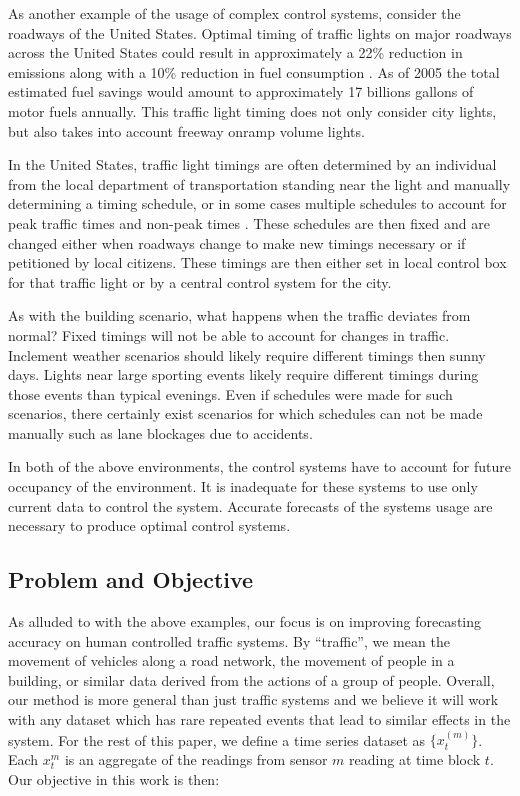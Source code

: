 As another example of the usage of complex control systems, consider the roadways of the United States.  Optimal timing of traffic lights on major roadways across the United States could result in approximately a 22\% reduction in emissions along with a 10\% reduction in fuel consumption \cite{DOT2007}.  As of 2005 the total estimated fuel savings would amount to approximately 17 billions gallons of motor fuels annually.  This traffic light timing does not only consider city lights, but also takes into account freeway onramp volume lights.

In the United States, traffic light timings are often determined by an individual from the local department of transportation standing near the light and manually determining a timing schedule, or in some cases multiple schedules to account for peak traffic times and non-peak times \cite{Koonce2008}.  These schedules are then fixed and are changed either when roadways change to make new timings necessary or if petitioned by local citizens.  These timings are then either set in local control box for that traffic light or by a central control system for the city.  

As with the building scenario, what happens when the traffic deviates from normal?  Fixed timings will not be able to account for changes in traffic.  Inclement weather scenarios should likely require different timings then sunny days.  Lights near large sporting events likely require different timings during those events than typical evenings.  Even if schedules were made for such scenarios, there certainly exist scenarios for which schedules can not be made manually such as lane blockages due to accidents. 

In both of the above environments, the control systems have to account for future occupancy of the environment.  It is inadequate for these systems to use only current data to control the system.  Accurate forecasts of the systems usage are necessary to produce optimal control systems.  

\subsection{Problem and Objective}
As alluded to with the above examples, our focus is on improving forecasting accuracy on human controlled traffic systems.  By “traffic”, we mean the movement of vehicles along a road network, the movement of people in a building, or similar data derived from the actions of a group of people.  Overall, our method is more general than just traffic systems and we believe it will work with any dataset which has rare repeated events that lead to similar effects in the system.  For the rest of this paper, we define a time series dataset as $\{x_{t}^{(m)}\}$.  Each $x_{t}^{m}$ is an aggregate of the readings from sensor $m$ reading at time block $t$.  Our objective in this work is then:

